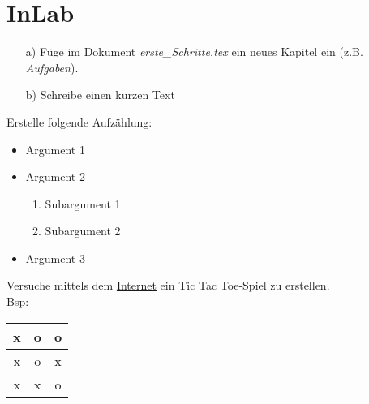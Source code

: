 \section{InLab}
	
	\begin{aufgabe}
		\begin{itemize}
		\item[a)] Füge im Dokument \textit{\glqq erste\_Schritte.tex\grqq{}} ein neues Kapitel ein (z.B. \textit{Aufgaben}).
		\item[b)] Schreibe einen kurzen Text
		\end{itemize}
	\end{aufgabe}

	
	\begin{aufgabe}
		Erstelle folgende Aufzählung:
		\begin{itemize}	
			\item Argument 1
			\item Argument 2
			\begin{enumerate}
				\item Subargument 1
				\item Subargument 2
			\end{enumerate}
			\item Argument 3
		\end{itemize}
	\end{aufgabe}
	
		
	\begin{aufgabe}
		Versuche mittels dem \href{https://tablesgenerator.com}{Internet} ein Tic Tac Toe-Spiel zu erstellen.\\
		Bsp:
		\begin{tabular}{c|c|c}
			x & o & o\\ \hline
			x & o & x\\ \hline
			x & x & o\\
		\end{tabular}
	\end{aufgabe}

